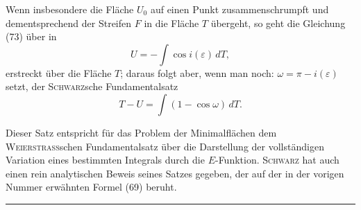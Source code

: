 Wenn insbesondere die Fläche $U_0$ auf einen Punkt zusammenschrumpft
und dementsprechend der Streifen $F$ in die Fläche $T$ übergeht, so geht die
Gleichung (73) über in
\[
U=-\int\cos i(\varepsilon)\,dT,
\]
erstreckt über die Fläche $T$; daraus folgt aber, wenn man noch: $\omega=\pi-i(\varepsilon)$
setzt, der \textsc{Schwarz}sche Fundamentalsatz
\[
T-U=\int(1-\cos\omega)\,dT.
\]

Dieser Satz entspricht für das Problem der Minimalflächen dem \textsc{Weierstrass}schen
Fundamentalsatz über die Darstellung der vollständigen Variation
eines bestimmten Integrals durch die $E$-Funktion. \textsc{Schwarz} hat auch einen
rein analytischen Beweis seines Satzes gegeben, der auf der in der vorigen
Nummer erwähnten Formel (69) beruht.
\par\begin{center}\rule{24mm}{0.3pt}\end{center}
\clearpage\endgroup

